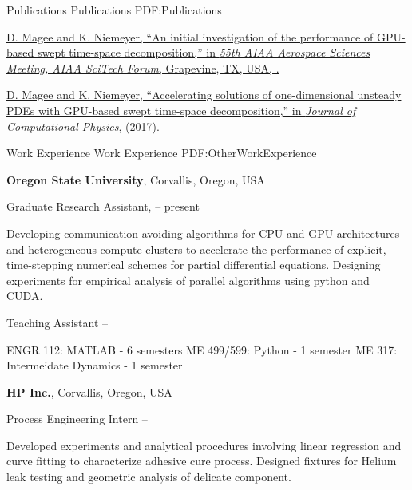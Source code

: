 \documentclass[letterpaper,MMMyyyy,nonstopmode]{simpleresumecv}
\begin{document}
\begin{Body}

\Section
{Publications}
{Publications}
{PDF:Publications}

\Gap
\href{https://arxiv.org/abs/1612.02495}
{D. Magee and K. Niemeyer,
``An initial investigation of the performance of GPU-based swept time-space decomposition,''
in \textit{55th AIAA Aerospace Sciences Meeting, AIAA SciTech Forum},
Grapevine, TX, USA,
.}

\Gap
\href{https://doi.org/10.1016/j.jcp.2017.12.028}
{D. Magee and K. Niemeyer,
``Accelerating solutions of one-dimensional unsteady PDEs with GPU-based swept time-space decomposition,''
in \textit{Journal of Computational Physics},
(2017).}


\Section
{Work Experience}
{Work Experience}
{PDF:OtherWorkExperience}

\Entry
\textbf{Oregon State University},
Corvallis, Oregon, USA

\BulletItem
Graduate Research Assistant,
\href{https://niemeyer-research-group.github.io}
{\underline{}}
\hfill
{} -- present

\begin{Detail}
\SubBulletItem
Developing communication-avoiding algorithms for CPU and GPU architectures and heterogeneous compute clusters to accelerate the performance of explicit, time-stepping numerical schemes for partial differential equations.
\SubBulletItem
Designing experiments for empirical analysis of parallel algorithms using python and CUDA.
\end{Detail}
\Gap

\BulletItem
Teaching Assistant 
\hfill
{} -- 

\begin{Detail}
\SubBulletItem
ENGR 112: MATLAB - 6 semesters 
\SubBulletItem
ME 499/599: Python - 1 semester
\SubBulletItem
ME 317: Intermeidate Dynamics - 1 semester
\end{Detail}
\BigGap

\Entry
\textbf{HP Inc.},
Corvallis, Oregon, USA

\BulletItem
Process Engineering Intern
\hfill
{} -- 

\begin{Detail}
\SubBulletItem
Developed experiments and analytical procedures involving linear regression and curve fitting to characterize adhesive cure process.
\SubBulletItem
Designed fixtures for Helium leak testing and geometric analysis of delicate component.
\end{Detail}
\BigGap


\end{Body}
\end{document}
